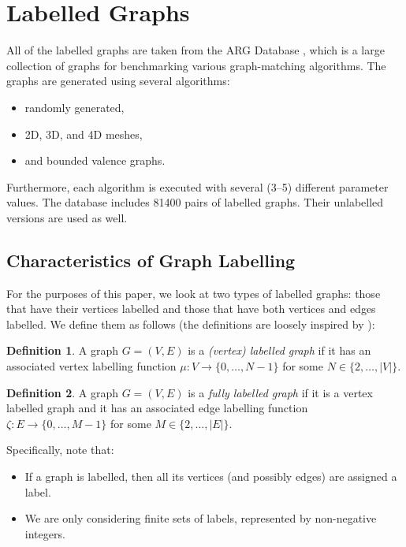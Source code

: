 \documentclass{l4proj}
\theoremstyle{definition}
\newtheorem{definition}{Definition}[section]
\theoremstyle{remark}
\begin{document}
\section{Labelled Graphs} \label{sec:labelled}
All of the labelled graphs are taken from the ARG Database \cite{foggia2001-2,
  DBLP:journals/prl/SantoFSV03}, which is a large collection of graphs for
benchmarking various graph-matching algorithms. The graphs are generated using
several algorithms:

\begin{itemize}
\item randomly generated,
\item 2D, 3D, and 4D meshes,
\item and bounded valence graphs.
\end{itemize}

Furthermore, each algorithm is executed with several (3--5) different parameter
values. The database includes 81400 pairs of labelled graphs. Their unlabelled
versions are used as well.

\subsection{Characteristics of Graph Labelling}
For the purposes of this paper, we look at two types of labelled graphs: those
that have their vertices labelled and those that have both vertices and edges
labelled. We define them as follows (the definitions are loosely inspired by
\cite{abu-aisheh_2016}):

\begin{definition}
  A graph $G = (V, E)$ is a \emph{(vertex) labelled graph} if it has an associated
  vertex labelling function $\mu \colon V \to \{ 0, \dots, N - 1 \}$ for some $N
  \in \{2, \dots, |V| \}$.
\end{definition}

\begin{definition}
  A graph $G = (V, E)$ is a \emph{fully labelled graph} if it is a vertex labelled
  graph and it has an associated edge labelling function $\zeta \colon E \to
  \{ 0, \dots, M - 1 \}$ for some $M \in \{ 2, \dots, |E| \}$.
\end{definition}

Specifically, note that:

\begin{itemize}
\item If a graph is labelled, then all its vertices (and possibly edges) are
  assigned a label.
\item We are only considering finite sets of labels, represented by non-negative integers.
\end{itemize}
\end{document}
